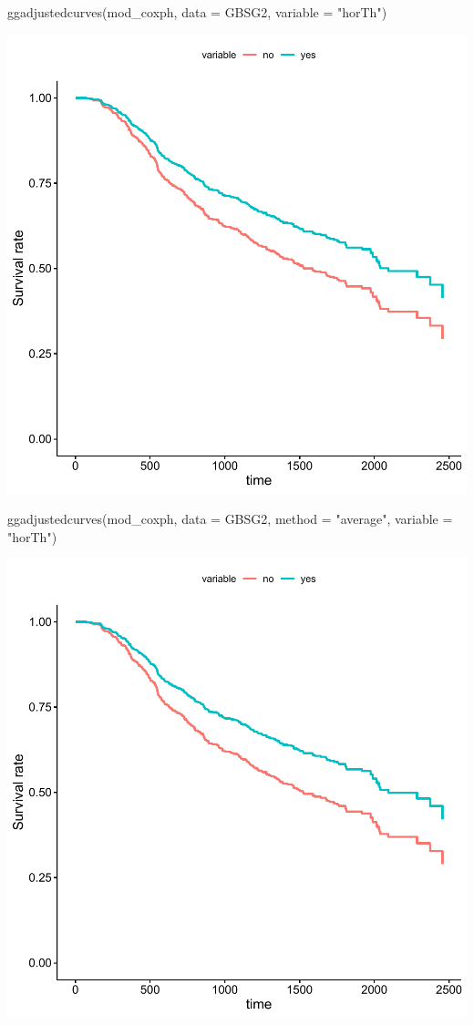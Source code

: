 \documentclass[
]{book}
\makeatletter
\newenvironment{Shaded}{\begin{snugshade}}{\end{snugshade}}
\newcommand{\AttributeTok}[1]{\textcolor[rgb]{0.61,0.61,0.61}{#1}}
\newcommand{\FunctionTok}[1]{\textcolor[rgb]{0,0,0}{#1}}
\newcommand{\NormalTok}[1]{#1}
\newcommand{\StringTok}[1]{\textcolor[rgb]{0.5,0.5,0.5}{#1}}
\newenvironment{kframe}{%
\medskip{}
\setlength{\fboxsep}{.8em}
 \def\at@end@of@kframe{}%
 \ifinner\ifhmode%
  \def\at@end@of@kframe{\end{minipage}}%
  \begin{minipage}{\columnwidth}%
 \fi\fi%
 \def\FrameCommand##1{\hskip\@totalleftmargin \hskip-\fboxsep
 \colorbox{shadecolor}{##1}\hskip-\fboxsep
     \hskip-\linewidth \hskip-\@totalleftmargin \hskip\columnwidth}%
 \MakeFramed {\advance\hsize-\width
   \@totalleftmargin\z@ \linewidth\hsize
   \@setminipage}}%
 {\par\unskip\endMakeFramed%
 \at@end@of@kframe}
\renewenvironment{Shaded}{\begin{kframe}}{\end{kframe}}
\makeatother
\begin{document}
\begin{Shaded}
\begin{Highlighting}[]
\FunctionTok{ggadjustedcurves}\NormalTok{(mod\_coxph, }\AttributeTok{data =}\NormalTok{ GBSG2, }\AttributeTok{variable =} \StringTok{"horTh"}\NormalTok{)}
\end{Highlighting}
\end{Shaded}

\begin{center}\includegraphics[width=0.7\linewidth,keepaspectratio]{Multivariable_Data_Analysis_files/figure-latex/unnamed-chunk-189-2} \end{center}

\begin{Shaded}
\begin{Highlighting}[]
\FunctionTok{ggadjustedcurves}\NormalTok{(mod\_coxph, }\AttributeTok{data =}\NormalTok{ GBSG2, }\AttributeTok{method =} \StringTok{"average"}\NormalTok{, }\AttributeTok{variable =} \StringTok{"horTh"}\NormalTok{)}
\end{Highlighting}
\end{Shaded}

\begin{center}\includegraphics[width=0.7\linewidth,keepaspectratio]{Multivariable_Data_Analysis_files/figure-latex/unnamed-chunk-189-3} \end{center}
\end{document}
